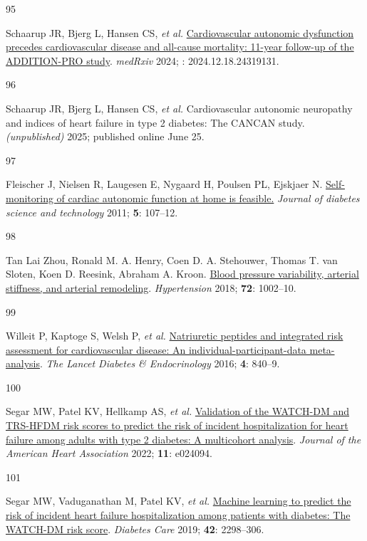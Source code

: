 \documentclass[
  a4paper,
  headsepline=true,
  open=left]{scrbook}
\newlength{\cslhangindent}
\newlength{\csllabelwidth}
\newlength{\cslentryspacingunit} %
\newenvironment{CSLReferences}[2] %
 {%
  \setlength{\parindent}{0pt}
  \ifodd #1
  \let\oldpar\par
  \def\par{\hangindent=\cslhangindent\oldpar}
  \fi
  \setlength{\parskip}{#2\cslentryspacingunit}
 }%
 {}
\newcommand{\CSLLeftMargin}[1]{\parbox[t]{\csllabelwidth}{#1}}
\newcommand{\CSLRightInline}[1]{\parbox[t]{\linewidth - \csllabelwidth}{#1}\break}
\begin{document}
\begin{CSLReferences}{0}{0}
\leavevmode{}%
\CSLLeftMargin{95 }%
\CSLRightInline{Schaarup JR, Bjerg L, Hansen CS, \emph{et al.}
\href{https://doi.org/10.1101/2024.12.18.24319131}{Cardiovascular
autonomic dysfunction precedes cardiovascular disease and all-cause
mortality: 11-year follow-up of the ADDITION-PRO study}. \emph{medRxiv}
2024; : 2024.12.18.24319131.}

\leavevmode{}%
\CSLLeftMargin{96 }%
\CSLRightInline{Schaarup JR, Bjerg L, Hansen CS, \emph{et al.}
Cardiovascular autonomic neuropathy and indices of heart failure in type
2 diabetes: The CANCAN study. \emph{(unpublished)} 2025; published
online June 25.}

\leavevmode{}%
\CSLLeftMargin{97 }%
\CSLRightInline{Fleischer J, Nielsen R, Laugesen E, Nygaard H, Poulsen
PL, Ejskjaer N.
\href{https://doi.org/10.1177/193229681100500115}{Self-monitoring of
cardiac autonomic function at home is feasible.} \emph{Journal of
diabetes science and technology} 2011; \textbf{5}: 107--12.}

\leavevmode{}%
\CSLLeftMargin{98 }%
\CSLRightInline{Tan Lai Zhou, Ronald M. A. Henry, Coen D. A. Stehouwer,
Thomas T. van Sloten, Koen D. Reesink, Abraham A. Kroon.
\href{https://doi.org/doi:10.1161/HYPERTENSIONAHA.118.11325}{Blood
pressure variability, arterial stiffness, and arterial remodeling}.
\emph{Hypertension} 2018; \textbf{72}: 1002--10.}

\leavevmode{}%
\CSLLeftMargin{99 }%
\CSLRightInline{Willeit P, Kaptoge S, Welsh P, \emph{et al.}
\href{https://doi.org/10.1016/S2213-8587(16)30196-6}{Natriuretic
peptides and integrated risk assessment for cardiovascular disease: An
individual-participant-data meta-analysis}. \emph{The Lancet Diabetes \&
Endocrinology} 2016; \textbf{4}: 840--9.}

\leavevmode{}%
\CSLLeftMargin{100 }%
\CSLRightInline{Segar MW, Patel KV, Hellkamp AS, \emph{et al.}
\href{https://doi.org/10.1161/JAHA.121.024094}{Validation of the
WATCH{-}DM and TRS{-}HFDM risk scores to predict the risk of incident
hospitalization for heart failure among adults with type 2 diabetes: A
multicohort analysis}. \emph{Journal of the American Heart Association}
2022; \textbf{11}: e024094.}

\leavevmode{}%
\CSLLeftMargin{101 }%
\CSLRightInline{Segar MW, Vaduganathan M, Patel KV, \emph{et al.}
\href{https://doi.org/10.2337/dc19-0587}{Machine learning to predict the
risk of incident heart failure hospitalization among patients with
diabetes: The WATCH-DM risk score}. \emph{Diabetes Care} 2019;
\textbf{42}: 2298--306.}


\end{CSLReferences}
\end{document}
